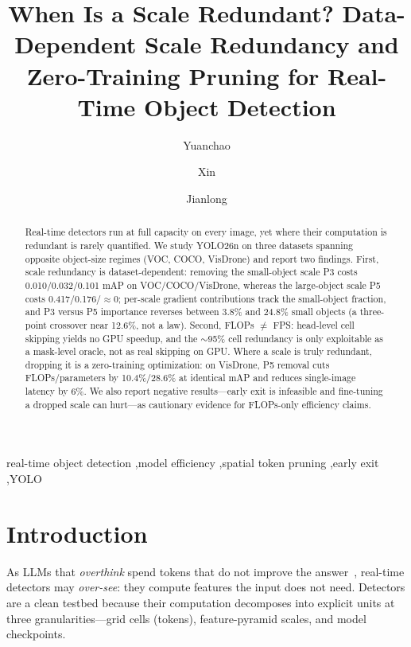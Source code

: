 \documentclass[times,twocolumn,final,authoryear]{elsarticle}
\begin{document}
\thispagestyle{empty}

\begin{frontmatter}

\title{When Is a Scale Redundant? Data-Dependent Scale Redundancy and Zero-Training Pruning for Real-Time Object Detection}

\author[1]{Yuanchao }
\author[1]{Xin }
\author[1]{Jianlong }

\address[1]{Department of Artificial Intelligence and Computational Science, Science and Technology College, Gannan Normal University, Ganzhou 341000, China}

\begin{abstract}
Real-time detectors run at full capacity on every image, yet where their computation is redundant is rarely quantified. We study YOLO26n on three datasets spanning opposite object-size regimes (VOC, COCO, VisDrone) and report two findings. First, scale redundancy is dataset-dependent: removing the small-object scale P3 costs 0.010/0.032/0.101 mAP on VOC/COCO/VisDrone, whereas the large-object scale P5 costs 0.417/0.176/$\approx$0; per-scale gradient contributions track the small-object fraction, and P3 versus P5 importance reverses between 3.8\% and 24.8\% small objects (a three-point crossover near 12.6\%, not a law). Second, FLOPs $\neq$ FPS: head-level cell skipping yields no GPU speedup, and the $\sim$95\% cell redundancy is only exploitable as a mask-level oracle, not as real skipping on GPU. Where a scale is truly redundant, dropping it is a zero-training optimization: on VisDrone, P5 removal cuts FLOPs/parameters by 10.4\%/28.6\% at identical mAP and reduces single-image latency by 6\%. We also report negative results---early exit is infeasible and fine-tuning a dropped scale can hurt---as cautionary evidence for FLOPs-only efficiency claims.
\end{abstract}

\begin{keyword}
\KWD real-time object detection \sep model efficiency \sep spatial token pruning \sep early exit \sep YOLO
\end{keyword}

\end{frontmatter}

\section{Introduction}
As LLMs that \emph{overthink} spend tokens that do not improve the answer~\cite{wei2022chain,feng2025efficient}, real-time detectors may \emph{over-see}: they compute features the input does not need. Detectors are a clean testbed because their computation decomposes into explicit units at three granularities---grid cells (tokens), feature-pyramid scales, and model checkpoints.
\end{document}
